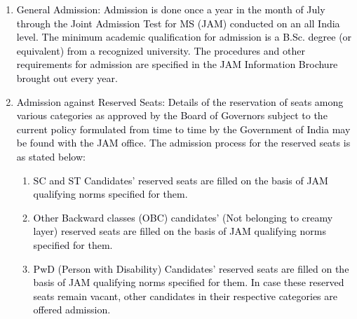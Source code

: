 \documentclass[12pt]{article}
\begin{document}
\vspace{\baselineskip}
\begin{enumerate}
	\item {\fontsize{10pt}{12.0pt}\selectfont \textcolor[HTML]{00000A}{General Admission: Admission is done once a year in the month of July through the Joint Admission Test for MS (JAM) conducted on an all India level. The minimum academic qualification for admission is a B.Sc. degree (or equivalent) from a recognized university. The procedures and other requirements for admission are specified in the JAM Information Brochure brought out every year.}\par}\par


\vspace{\baselineskip}
	\item {\fontsize{10pt}{12.0pt}\selectfont \textcolor[HTML]{00000A}{Admission against Reserved Seats: Details of the reservation of seats among various categories as approved by the Board of Governors subject to the current policy formulated from time to time by the Government of India may be found with the JAM office. The admission process for the reserved seats is as stated below:}\par}\par


\vspace{\baselineskip}
\begin{enumerate}
	\item {\fontsize{10pt}{12.0pt}\selectfont \textcolor[HTML]{00000A}{SC and ST Candidates' reserved seats are filled on the basis of JAM qualifying norms specified for them.}\par}\par


\vspace{\baselineskip}
	\item {\fontsize{10pt}{12.0pt}\selectfont \textcolor[HTML]{00000A}{Other Backward classes (OBC) candidates' (Not belonging to creamy layer) reserved seats are filled on the basis of JAM qualifying norms specified for them.}\par}\par


\vspace{\baselineskip}
	\item {\fontsize{10pt}{12.0pt}\selectfont \textcolor[HTML]{00000A}{PwD (Person with Disability) Candidates' reserved seats are filled on the basis of JAM qualifying norms specified for them. In case these reserved seats remain vacant, other candidates in their respective categories are offered admission.}\par}
\end{enumerate}
\end{enumerate}\par
\end{document}
